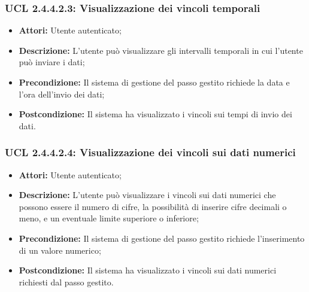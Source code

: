 \hypertarget{L2.4.4.2.3}{}
\subsubsection{UCL 2.4.4.2.3: Visualizzazione dei vincoli temporali}
\begin{itemize}
\item \textbf{Attori:} Utente autenticato;
\item \textbf{Descrizione:} L'utente può visualizzare gli intervalli temporali in cui l'utente può inviare i dati;
\item \textbf{Precondizione:} Il sistema di gestione del passo gestito richiede la data e l'ora dell'invio dei dati;
\item \textbf{Postcondizione:} Il sistema ha visualizzato i vincoli sui tempi di invio dei dati.
\end{itemize}

\hypertarget{L2.4.4.2.4}{}
\subsubsection{UCL 2.4.4.2.4: Visualizzazione dei vincoli sui dati numerici}
\begin{itemize}
\item \textbf{Attori:} Utente autenticato;
\item \textbf{Descrizione:} L'utente può visualizzare i vincoli sui dati numerici che possono essere il numero di cifre, la possibilità di inserire cifre decimali o meno, e un eventuale limite superiore o inferiore;
\item \textbf{Precondizione:} Il sistema di gestione del passo gestito richiede l'inserimento di un valore numerico;
\item \textbf{Postcondizione:} Il sistema ha visualizzato i vincoli sui dati numerici richiesti dal passo gestito.
\end{itemize}

